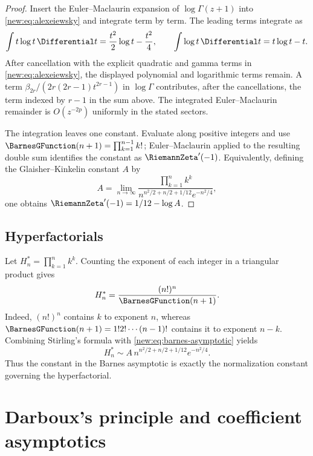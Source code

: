 \documentclass[11pt,a4paper,oneside,openany]{book}
\theoremstyle{definition}
\theoremstyle{remark}
\begin{document}
\begin{proof}
Insert the Euler--Maclaurin expansion of $\log\Gamma(z+1)$ into
\eqref{new:eq:alexeiewsky} and integrate term by term.  The leading terms
integrate as
\[
 \int t\log t\,\Differential t=\frac{t^2}{2}\log t-\frac{t^2}{4},
 \qquad
 \int\log t\,\Differential t=t\log t-t.
\]
After cancellation with the explicit quadratic and gamma terms in
\eqref{new:eq:alexeiewsky}, the displayed polynomial and logarithmic terms
remain.  A term
$\beta_{2r}/(2r(2r-1)t^{2r-1})$ in $\log\Gamma$ contributes, after the
cancellations, the term indexed by $r-1$ in the sum above.  The integrated
Euler--Maclaurin remainder is $O(z^{-2p})$ uniformly in the stated sectors.

The integration leaves one constant.  Evaluate along positive integers and use
$\BarnesGFunction(n+1)=\prod_{k=1}^{n-1}k!$; Euler--Maclaurin applied to the resulting double
sum identifies the constant as $\RiemannZeta'(-1)$.  Equivalently, defining the
Glaisher--Kinkelin constant $A$ by
\begin{equation}
 A=\lim_{n\to\infty}
 \frac{\prod_{k=1}^n k^k}
 {n^{n^2/2+n/2+1/12}e^{-n^2/4}},
 \label{new:eq:glaisher-definition}
\end{equation}
one obtains $\RiemannZeta'(-1)=1/12-\log A$.
\end{proof}

\section{Hyperfactorials}

Let $H_n^*=\prod_{k=1}^n k^k$.  Counting the exponent of each integer in a
triangular product gives
\begin{equation}
 H_n^*=\frac{(n!)^n}{\BarnesGFunction(n+1)}.
 \label{new:eq:hyperfactorial-barnes}
\end{equation}
Indeed, $(n!)^n$ contains $k$ to exponent $n$, whereas $\BarnesGFunction(n+1)=1!2!\cdots
(n-1)!$ contains it to exponent $n-k$.  Combining Stirling's formula with
\eqref{new:eq:barnes-asymptotic} yields
\begin{equation}
 H_n^*\sim
 A\,n^{n^2/2+n/2+1/12}e^{-n^2/4}.
 \label{new:eq:hyperfactorial-asymptotic}
\end{equation}
Thus the constant in the Barnes asymptotic is exactly the normalization
constant governing the hyperfactorial.

\chapter{Darboux's principle and coefficient asymptotics}
\label{ch:darboux}
\end{document}
